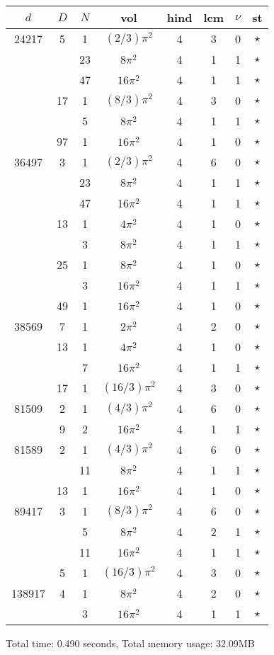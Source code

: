 \begin{tabular}{ccc|ccccc}
$d$ & $D$ & $N$ & vol & hind & lcm & $\nu$ & st\\
\hline
24217 & 5 & 1 & $(2/3)\pi^2$ & 4 & 3 & 0 & $\star$ \\
 &  & 23 & $8\pi^2$ & 4 & 1 & 1 & $\star$ \\
 &  & 47 & $16\pi^2$ & 4 & 1 & 1 & $\star$ \\
 & 17 & 1 & $(8/3)\pi^2$ & 4 & 3 & 0 & $\star$ \\
 &  & 5 & $8\pi^2$ & 4 & 1 & 1 & $\star$ \\
 & 97 & 1 & $16\pi^2$ & 4 & 1 & 0 & $\star$ \\
36497 & 3 & 1 & $(2/3)\pi^2$ & 4 & 6 & 0 & $\star$ \\
 &  & 23 & $8\pi^2$ & 4 & 1 & 1 & $\star$ \\
 &  & 47 & $16\pi^2$ & 4 & 1 & 1 & $\star$ \\
 & 13 & 1 & $4\pi^2$ & 4 & 1 & 0 & $\star$ \\
 &  & 3 & $8\pi^2$ & 4 & 1 & 1 & $\star$ \\
 & 25 & 1 & $8\pi^2$ & 4 & 1 & 0 & $\star$ \\
 &  & 3 & $16\pi^2$ & 4 & 1 & 1 & $\star$ \\
 & 49 & 1 & $16\pi^2$ & 4 & 1 & 0 & $\star$ \\
38569 & 7 & 1 & $2\pi^2$ & 4 & 2 & 0 & $\star$ \\
 & 13 & 1 & $4\pi^2$ & 4 & 1 & 0 & $\star$ \\
 &  & 7 & $16\pi^2$ & 4 & 1 & 1 & $\star$ \\
 & 17 & 1 & $(16/3)\pi^2$ & 4 & 3 & 0 & $\star$ \\
81509 & 2 & 1 & $(4/3)\pi^2$ & 4 & 6 & 0 & $\star$ \\
 & 9 & 2 & $16\pi^2$ & 4 & 1 & 1 & $\star$ \\
81589 & 2 & 1 & $(4/3)\pi^2$ & 4 & 6 & 0 & $\star$ \\
 &  & 11 & $8\pi^2$ & 4 & 1 & 1 & $\star$ \\
 & 13 & 1 & $16\pi^2$ & 4 & 1 & 0 & $\star$ \\
89417 & 3 & 1 & $(8/3)\pi^2$ & 4 & 6 & 0 & $\star$ \\
 &  & 5 & $8\pi^2$ & 4 & 2 & 1 & $\star$ \\
 &  & 11 & $16\pi^2$ & 4 & 1 & 1 & $\star$ \\
 & 5 & 1 & $(16/3)\pi^2$ & 4 & 3 & 0 & $\star$ \\
138917 & 4 & 1 & $8\pi^2$ & 4 & 2 & 0 & $\star$ \\
 &  & 3 & $16\pi^2$ & 4 & 1 & 1 & $\star$ \\
\end{tabular}
Total time: 0.490 seconds, Total memory usage: 32.09MB
